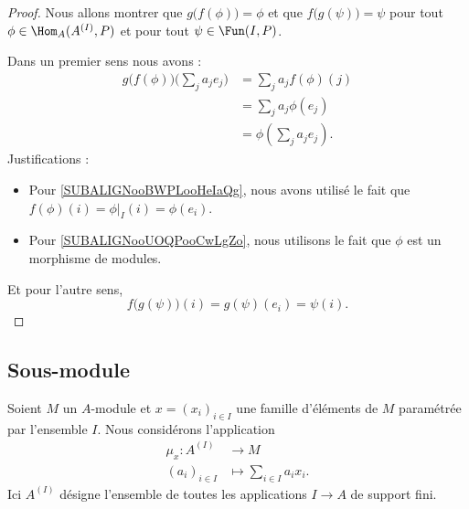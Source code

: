 \begin{proof}
    Nous allons montrer que \( g\big( f(\phi) \big)=\phi\) et que \( f\big( g(\psi) \big)=\psi\) pour tout \( \phi\in\Hom_A(A^{(I)},P)\) et pour tout \( \psi\in \Fun(I,P)\).

    Dans un premier sens nous avons :
    \begin{subequations}
        \begin{align}
            g\big( f(\phi) \big)\big( \sum_ja_je_j \big)&=\sum_ja_jf(\phi)(j)\\
            &=\sum_ja_j\phi(e_j)\label{SUBALIGNooBWPLooHeIaQg}\\
            &=\phi(\sum_ja_je_j)        \label{SUBALIGNooUOQPooCwLgZo}.
        \end{align}
    \end{subequations}
    Justifications :
    \begin{itemize}
        \item 
            Pour \eqref{SUBALIGNooBWPLooHeIaQg}, nous avons utilisé le fait que \( f(\phi)(i)=\phi|_I(i)=\phi(e_i)\).
        \item
            Pour \eqref{SUBALIGNooUOQPooCwLgZo}, nous utilisons le fait que \( \phi\) est un morphisme de modules.
    \end{itemize}
    Et pour l'autre sens,
    \begin{equation}
        f\big( g(\psi) \big)(i)=g(\psi)(e_i)=\psi(i).
    \end{equation}
\end{proof}

\subsection{Sous-module}

Soient \( M\) un \( A\)-module et \( x=(x_i)_{i\in I}\) une famille d'éléments de \( M\) paramétrée par l'ensemble \( I\). Nous considérons l'application
\begin{equation}
    \begin{aligned}
        \mu_x\colon A^{(I)}&\to M \\
        (a_i)_{i\in I}&\mapsto \sum_{i\in I}a_ix_i.
    \end{aligned}
\end{equation}
Ici \( A^{(I)}\) désigne l'ensemble de toutes les applications \( I\to A\) de support fini.

